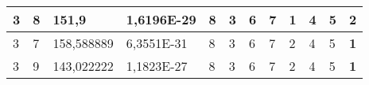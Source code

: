 \documentclass[conference]{IEEEtran}
\begin{document}
\begin{table*}[]
\begin{tabular}{|llll|llllllll|}
\multicolumn{1}{|l|}{3}                                                     & \multicolumn{1}{l|}{8}                                                        & \multicolumn{1}{l|}{151,9}                                                        & 1,6196E-29                     & \multicolumn{1}{l|}{8}                                                  & \multicolumn{1}{l|}{3}                                                  & \multicolumn{1}{l|}{6}                                                  & \multicolumn{1}{l|}{7}                                                  & \multicolumn{1}{l|}{\textbf{1}}                                         & \multicolumn{1}{l|}{4}                                                  & \multicolumn{1}{l|}{5}                                                  & 2                          \\ \hline
\multicolumn{1}{|l|}{3}                                                     & \multicolumn{1}{l|}{7}                                                        & \multicolumn{1}{l|}{158,588889}                                                   & 6,3551E-31                     & \multicolumn{1}{l|}{8}                                                  & \multicolumn{1}{l|}{3}                                                  & \multicolumn{1}{l|}{6}                                                  & \multicolumn{1}{l|}{7}                                                  & \multicolumn{1}{l|}{2}                                                  & \multicolumn{1}{l|}{4}                                                  & \multicolumn{1}{l|}{5}                                                  & \textbf{1}                 \\ \hline
\multicolumn{1}{|l|}{3}                                                     & \multicolumn{1}{l|}{9}                                                        & \multicolumn{1}{l|}{143,022222}                                                   & 1,1823E-27                     & \multicolumn{1}{l|}{8}                                                  & \multicolumn{1}{l|}{3}                                                  & \multicolumn{1}{l|}{6}                                                  & \multicolumn{1}{l|}{7}                                                  & \multicolumn{1}{l|}{2}                                                  & \multicolumn{1}{l|}{4}                                                  & \multicolumn{1}{l|}{5}                                                  & \textbf{1}                 \\ \hline

\end{tabular}
\end{table*}
\end{document}
